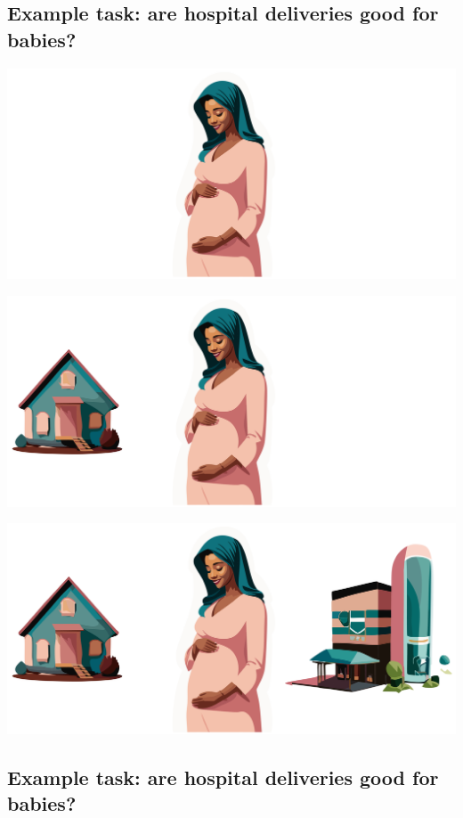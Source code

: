 \documentclass[
  letterpaper,
  DIV=11,
  numbers=noendperiod]{scrartcl}
\begin{document}
\subsection{Example task: are hospital deliveries good for
babies?}\label{example-task-are-hospital-deliveries-good-for-babies}

\includegraphics{figs/delivery1.png}

\includegraphics{figs/delivery2.png}

\includegraphics{figs/delivery.png}

\subsection{Example task: are hospital deliveries good for
babies?}\label{example-task-are-hospital-deliveries-good-for-babies-1}
\end{document}
